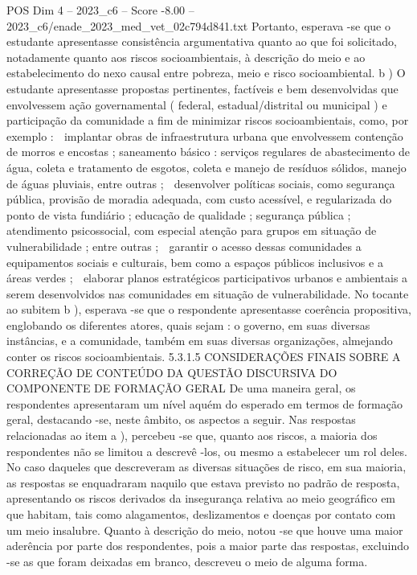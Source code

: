 \begin{textsample}{POS Dim 4 – 2023\_c6 – Score -8.00 – 2023\_c6/enade\_2023\_med\_vet\_02c794d841.txt}
Portanto, esperava -se que o estudante apresentasse consistência argumentativa quanto ao que foi solicitado, notadamente quanto aos riscos socioambientais, à descrição do meio e ao estabelecimento do nexo causal entre pobreza, meio e risco socioambiental. b ) O estudante apresentasse propostas pertinentes, factíveis e bem desenvolvidas que envolvessem ação governamental ( federal, estadual/distrital ou municipal ) e participação da comunidade a fim de minimizar riscos socioambientais, como, por exemplo :  implantar obras de infraestrutura urbana que envolvessem contenção de morros e encostas ; saneamento básico : serviços regulares de abastecimento de água, coleta e tratamento de esgotos, coleta e manejo de resíduos sólidos, manejo de águas pluviais, entre outras ;  desenvolver políticas sociais, como segurança pública, provisão de moradia adequada, com custo acessível, e regularizada do ponto de vista fundiário ; educação de qualidade ; segurança pública ; atendimento psicossocial, com especial atenção para grupos em situação de vulnerabilidade ; entre outras ;  garantir o acesso dessas comunidades a equipamentos sociais e culturais, bem como a espaços públicos inclusivos e a áreas verdes ;  elaborar planos estratégicos participativos urbanos e ambientais a serem desenvolvidos nas comunidades em situação de vulnerabilidade.
No tocante ao subitem b ), esperava -se que o respondente apresentasse coerência propositiva, englobando os diferentes atores, quais sejam : o governo, em suas diversas instâncias, e a comunidade, também em suas diversas organizações, almejando conter os riscos socioambientais. 5.3.1.5 CONSIDERAÇÕES FINAIS SOBRE A CORREÇÃO DE CONTEÚDO DA QUESTÃO DISCURSIVA DO COMPONENTE DE FORMAÇÃO GERAL De uma maneira geral, os respondentes apresentaram um nível aquém do esperado em termos de formação geral, destacando -se, neste âmbito, os aspectos a seguir.
Nas respostas relacionadas ao item a ), percebeu -se que, quanto aos riscos, a maioria dos respondentes não se limitou a descrevê -los, ou mesmo a estabelecer um rol deles.
No caso daqueles que descreveram as diversas situações de risco, em sua maioria, as respostas se enquadraram naquilo que estava previsto no padrão de resposta, apresentando os riscos derivados da insegurança relativa ao meio geográfico em que habitam, tais como alagamentos, deslizamentos e doenças por contato com um meio insalubre.
Quanto à descrição do meio, notou -se que houve uma maior aderência por parte dos respondentes, pois a maior parte das respostas, excluindo -se as que foram deixadas em branco, descreveu o meio de alguma forma.

\end{textsample}
